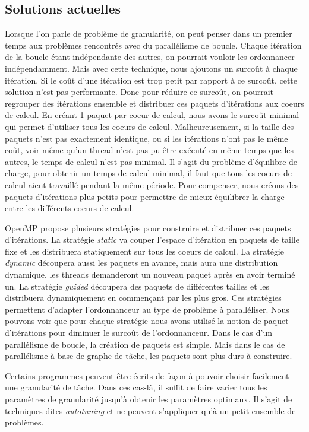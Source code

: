 \subsection{Solutions actuelles}
Lorsque l'on parle de problème de granularité, on peut penser dans un premier temps aux problèmes rencontrés avec du parallélisme de boucle.
%
Chaque itération de la boucle étant indépendante des autres, on pourrait vouloir les ordonnancer indépendamment.
%
Mais avec cette technique, nous ajoutons un surcoût à chaque itération.
%
Si le coût d'une itération est trop petit par rapport à ce surcoût, cette solution n'est pas performante.
%
Donc pour réduire ce surcoût, on pourrait regrouper des itérations ensemble et distribuer ces paquets d'itérations aux coeurs de calcul.
%
En créant 1 paquet par coeur de calcul, nous avons le surcoût minimal qui permet d'utiliser tous les coeurs de calcul.
%
Malheureusement, si la taille des paquets n'est pas exactement identique, ou si les itérations n'ont pas le même coût, voir même qu'un thread n'est pas pu être exécuté en même temps que les autres, le temps de calcul n'est pas minimal.
%
Il s'agit du problème d'équilibre de charge, pour obtenir un temps de calcul minimal, il faut que tous les coeurs de calcul aient travaillé pendant la même période.
%
Pour compenser, nous créons des paquets d'itérations plus petits pour permettre de mieux équilibrer la charge entre les différents coeurs de calcul.

OpenMP propose plusieurs stratégies pour construire et distribuer ces paquets d'itérations.
%
La stratégie {\em static} va couper l'espace d'itération en paquets de taille fixe et les distribuera statiquement sur tous les coeurs de calcul.
%
La stratégie {\em dynamic} découpera aussi les paquets en avance, mais aura une distribution dynamique, les threads demanderont un nouveau paquet après en avoir terminé un.
%
La stratégie {\em guided} découpera des paquets de différentes tailles et les distribuera dynamiquement en commençant par les plus gros.
%
Ces stratégies permettent d'adapter l'ordonnanceur au type de problème à paralléliser.
%
Nous pouvons voir que pour chaque stratégie nous avons utilisé la notion de paquet d'itérations pour diminuer le surcoût de l'ordonnanceur.
%
Dans le cas d'un parallélisme de boucle, la création de paquets est simple.
%
Mais dans le cas de parallélisme à base de graphe de tâche, les paquets sont plus durs à construire.

Certains programmes peuvent être écrits de façon à pouvoir choisir facilement une granularité de tâche.
%
Dans ces cas-là, il suffit de faire varier tous les paramètres de granularité jusqu'à obtenir les paramètres optimaux.
%
Il s'agit de techniques dites {\em autotuning} et ne peuvent s'appliquer qu'à un petit ensemble de problèmes.

